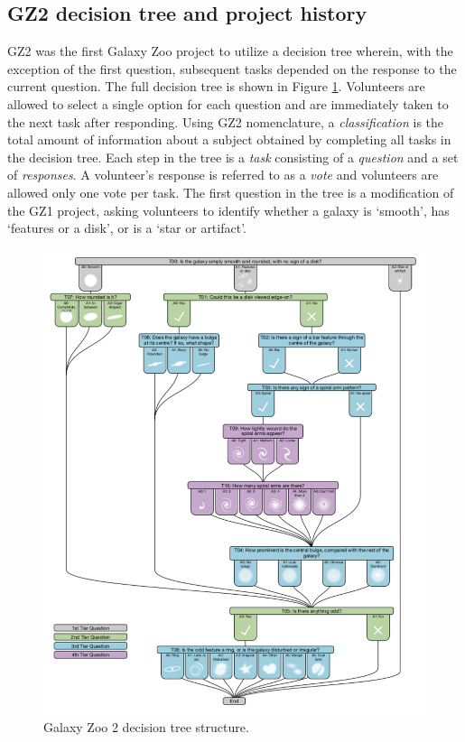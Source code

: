 \subsection{GZ2 decision tree and project history}

GZ2 was the first Galaxy Zoo project to utilize a decision tree wherein, with the exception of the first question, subsequent tasks depended on the response to the current question. The full decision tree is shown in Figure \ref{fig: gz2 decision tree}. Volunteers are allowed to select a single option for each question and are immediately taken to the next task after responding.  Using GZ2 nomenclature, a \textit{classification} is the total amount of information about a subject obtained by completing all tasks in the decision tree. Each step in the tree is a \textit{task} consisting of a \textit{question} and a set of \textit{responses}. A volunteer's response is referred to as a \textit{vote} and volunteers are allowed only one vote per task. The first question in the tree is a modification of the GZ1 project, asking volunteers to identify whether a galaxy is `smooth', has `features or a disk', or is a `star or artifact'. 

\begin{figure}[h!]
\includegraphics[width=\textwidth]{Figures/gz2_tree.pdf}
\caption[Galaxy Zoo 2 decision tree]{Galaxy Zoo 2 decision tree structure.}
\label{fig: gz2 decision tree}
\end{figure}


